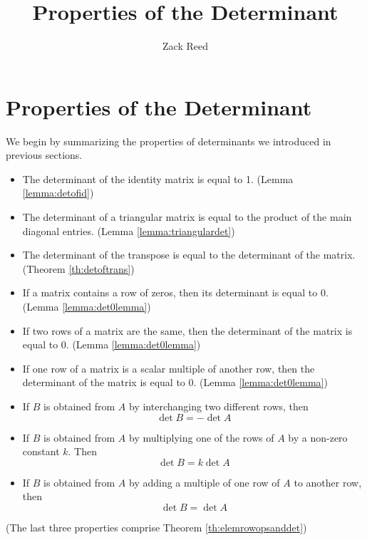 \documentclass{ximera}
\author{Zack Reed}
\title{Properties of the Determinant}
\begin{document}
\begin{abstract}

\end{abstract}
\maketitle


\section*{Properties of the Determinant}
We begin by summarizing the properties of determinants we introduced in previous sections.
 
\begin{summary}
\begin{itemize}
\item The determinant of the identity matrix is equal to 1. (Lemma \ref{lemma:detofid})
\item The determinant of a triangular matrix is equal to the product of the main diagonal entries. (Lemma \ref{lemma:triangulardet})
\item The determinant of the transpose is equal to the determinant of the matrix. (Theorem \ref{th:detoftrans})
\item If a matrix contains a row of zeros, then its determinant is equal to 0. (Lemma \ref{lemma:det0lemma})
\item If two rows of a matrix are the same, then the determinant of the matrix is equal to 0.  (Lemma \ref{lemma:det0lemma})
\item If one row of a matrix is a scalar multiple of another row, then the determinant of the matrix is equal to 0. (Lemma \ref{lemma:det0lemma})
 
\item
If $B$ is obtained from $A$ by interchanging two different rows, then $$\det{B}=-\det{A}$$
\item
If $B$ is obtained from $A$ by multiplying one of the rows of $A$ by a non-zero constant $k$.  Then $$\det{B}=k\det{A}$$
\item
If $B$ is obtained from $A$ by adding a multiple of one row of $A$ to another row, then
$$\det{B}=\det{A}$$
\end{itemize}
(The last three properties comprise Theorem \ref{th:elemrowopsanddet})
\end{summary}
\end{document}
